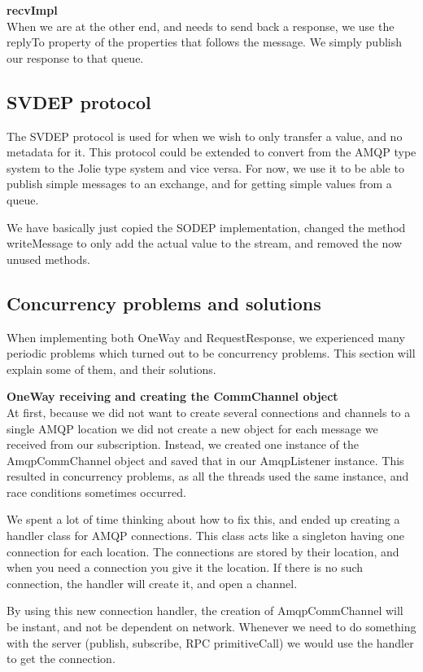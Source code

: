 \noindent\textbf{recvImpl}\\
When we are at the other end, and needs to send back a response, we use the replyTo property of the properties that follows the message. We simply publish our response to that queue.


\subsection{SVDEP protocol}
\label{subsec:SVDEP} %
The SVDEP protocol is used for when we wish to only transfer a value, and no metadata for it. This protocol could be extended to convert from the AMQP type system to the Jolie type system and vice versa. For now, we use it to be able to publish simple messages to an exchange, and for getting simple values from a queue.

We have basically just copied the SODEP implementation, changed the method writeMessage to only add the actual value to the stream, and removed the now unused methods.

\subsection{Concurrency problems and solutions}
When implementing both OneWay and RequestResponse, we experienced many periodic problems which turned out to be concurrency problems. This section will explain some of them, and their solutions.

\noindent\textbf{OneWay receiving and creating the CommChannel object}\\
At first, because we did not want to create several connections and channels to a single AMQP location we did not create a new object for each message we received from our subscription. Instead, we created one instance of the AmqpCommChannel object and saved that in our AmqpListener instance. This resulted in concurrency problems, as all the threads used the same instance, and race conditions sometimes occurred.

We spent a lot of time thinking about how to fix this, and ended up creating a handler class for AMQP connections. This class acts like a singleton having one connection for each location. The connections are stored by their location, and when you need a connection you give it the location. If there is no such connection, the handler will create it, and open a channel.

By using this new connection handler, the creation of AmqpCommChannel will be instant, and not be dependent on network. Whenever we need to do something with the server (publish, subscribe, RPC primitiveCall) we would use the handler to get the connection.

